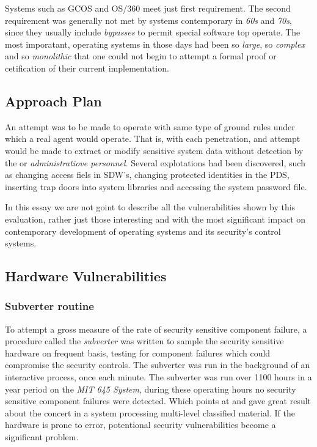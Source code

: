 Systems such as GCOS and OS/360 meet just first requirement. The second requirement was generally not met by
systems contemporary in \textit{60s} and \textit{70s}, since they usually include \textit{bypasses} to permit
special software top operate.
The most imporatant, operating systems in those days had been so \textit{large}, so \textit{complex} and 
so \textit{monolithic} that one could not begin to attempt a formal proof or cetification of their current 
implementation. 

\subsection{Approach Plan}

An attempt was to be made to operate with same type of ground rules under which a real agent would operate.
That is, with each penetration, and attempt would be made to extract or modify sensitive system data 
without detection by the  or \textit{administratiove personnel}.
Several explotations had been discovered, such as changing access fiels in SDW's, changing protected 
identities in the PDS, inserting trap doors into system libraries and accessing the system password file.

In this essay we are not goint to describe all the vulnerabilities shown by this evaluation, rather just those 
interesting and with the most significant impact on contemporary development of operating systems and its 
security's control systems.

\subsection{Hardware Vulnerabilities}

\subsubsection{Subverter routine}

To attempt a gross measure of the rate of security sensitive component failure, a procedure called the 
\textit{subverter} was written to sample the security sensitive hardware on frequent basis, testing for 
component failures which could compromise the security controls.
The subverter was run in the background of an interactive process, once each minute. The subverter was run 
over 1100 hours in a year period on the \textit{MIT 645 System}, during these operating hours no security sensitive 
component failures were detected.
Which points at and gave great result about the concert in a system processing multi-level classified material.
If the hardware is prone to error, potentional security vulnerabilities become a significant problem.

